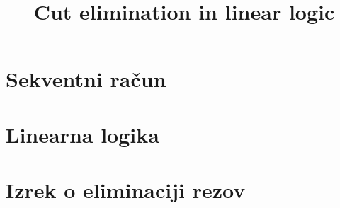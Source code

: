 \documentclass[mat1, tisk]{fmfdelo}
\title{Cut elimination in linear logic}
\begin{document}

\section{Sekventni račun} \label{seq_calc}


\section{Linearna logika}


\section{Izrek o eliminaciji rezov}


\end{document}

